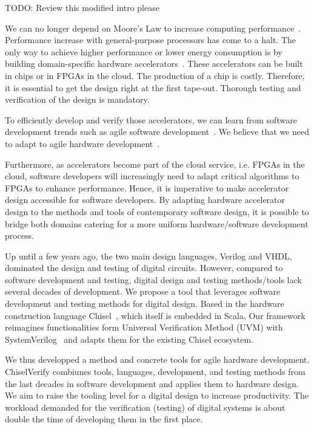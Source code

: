 \documentclass[conference]{IEEEtran}
\newcommand{\todo}[1]{{\color{olive} TODO: #1}}
\begin{document}
\todo{Review this modified intro please}

We can no longer depend on Moore's Law to increase computing performance~\cite{dark-silicon:2011}.
Performance increase with general-purpose processors has come to a halt.
The only way to achieve higher performance or lower energy consumption
is by building domain-specific hardware accelerators~\cite{domain-hw-acc:2020}.
These accelerators can be built in chips or in FPGAs in the cloud.
The production of a chip is costly. Therefore, it is essential to get
the design right at the first tape-out. Thorough testing and verification of the design is mandatory.

To efficiently develop and verify those accelerators, we can learn from software development trends such as agile software development~\cite{agile:manifesto}.
We believe that we need to adapt to agile hardware development~\cite{henn-patt:turing:2019}.

Furthermore, as accelerators become part of the cloud service, i.e. FPGAs in the cloud,
software developers will increasingly need to adapt critical algorithms to FPGAs to enhance performance.
Hence, it is imperative to make accelerator design accessible for software developers.
By adapting hardware accelerator design to the methods and tools of contemporary software design,
it is possible to bridge both domains catering for a more uniform hardware/software development process.

Up until a few years ago, the two main design languages, Verilog and VHDL, dominated the
design and testing of digital circuits.
However, compared to software development and testing, digital design and testing methods/tools 
lack several decades of development. We propose a tool that
leverages software development and testing methods for digital design.
Based in the hardware construction language Chisel~\cite{chisel:dac2012}, which itself is embedded in Scala,
Our framework reimagines functionalities form Universal Verification Method (UVM) with SystemVerilog~\cite{SystemVerilog} and
adapts them for the existing Chisel ecosystem.

We thus developped a method and concrete tools for agile hardware development.
ChiselVerify combiunes tools, languages, development, and testing methods from the last decades in
software development and applies them to hardware design.
We aim to raise the tooling level for a digital design to increase productivity.
The workload demanded for the verification (testing) of digital systems is about double the time of developing
them in the first place.
\end{document}

